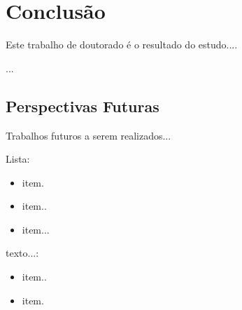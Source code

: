 \chapter*[Conclusão]{Conclusão}

Este trabalho de doutorado é o resultado do estudo....


...


\section*{Perspectivas Futuras}

Trabalhos futuros a serem realizados...

Lista:
\begin{itemize}
	\item item.
	\item item..
	\item item...
\end{itemize}

texto...:
\begin{itemize}
	\item item..
	\item item.
\end{itemize}

